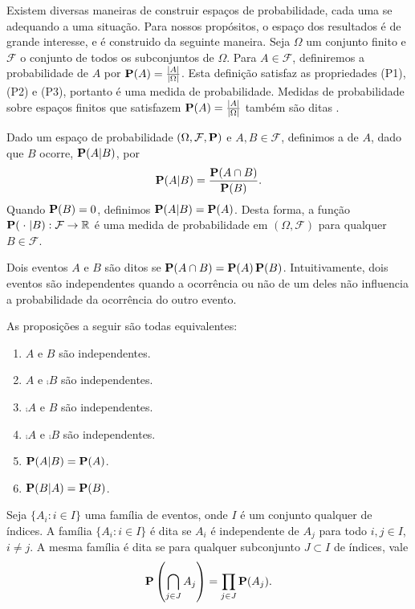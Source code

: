 Existem diversas maneiras de construir espaços de probabilidade, cada uma se adequando a uma situação. Para nossos propósitos, o espaço dos resultados  é de grande interesse, e é construido da seguinte maneira.
Seja $\Omega$ um conjunto finito e $\mathcal{F}$ o conjunto de todos os subconjuntos de $\Omega$. Para $A \in \mathcal{F}$, definiremos a probabilidade de $A$ por $\operatorname{\mathbf{P}}(A) = \frac{\left | A \right |}{\left | \Omega \right |}$. Esta definição satisfaz as propriedades (P1), (P2) e (P3), portanto é uma medida de probabilidade. Medidas de probabilidade sobre espaços finitos que satisfazem $\operatorname{\mathbf{P}}(A) = \frac{\left | A \right |}{\left | \Omega \right |}$ também são ditas .

Dado um espaço de probabilidade $(\Omega, \mathcal{F}, \operatorname{\mathbf{P}})$ e $A, B \in \mathcal{F}$, definimos a  de $A$, dado que $B$ ocorre, $\operatorname{\mathbf{P}}(A | B)$, por
\[ \operatorname{\mathbf{P}}(A|B) = \frac{\operatorname{\mathbf{P}}(A \cap B)}{\operatorname{\mathbf{P}}(B)}. \]
Quando $\operatorname{\mathbf{P}}(B) = 0$, definimos $\operatorname{\mathbf{P}}(A|B) = \operatorname{\mathbf{P}}(A)$. Desta forma, a função $\operatorname{\mathbf{P}}(\; \cdot \;| B) : \mathcal{F} \to \mathbb{R}$ é uma medida de probabilidade em $(\Omega, \mathcal{F})$ para qualquer $B \in \mathcal{F}$.

Dois eventos $A$ e $B$ são ditos  se $\operatorname{\mathbf{P}}(A \cap B) = \operatorname{\mathbf{P}}(A) \operatorname{\mathbf{P}}(B)$. Intuitivamente, dois eventos são independentes quando a ocorrência ou não de um deles não influencia a probabilidade da ocorrência do outro evento.

As proposições a seguir são todas equivalentes:
\begin{enumerate}[label=\arabic*.,itemindent=*]
  \item $A$ e $B$ são independentes.
  \item $A$ e $\comp{B}$ são independentes.
  \item $\comp{A}$ e $B$ são independentes.
  \item $\comp{A}$ e $\comp{B}$ são independentes.
  \item $\operatorname{\mathbf{P}}(A|B) = \operatorname{\mathbf{P}}(A)$.
  \item $\operatorname{\mathbf{P}}(B|A) = \operatorname{\mathbf{P}}(B)$.
\end{enumerate}

Seja $\{ A_i : i \in I\}$ uma família de eventos, onde $I$ é um conjunto qualquer de índices. A família $\{ A_i : i \in I\}$ é dita  se $A_i$ é independente de $A_j$ para todo $i,j \in I$, $i \neq j$. A mesma família é dita  se para qualquer subconjunto $J \subset I$ de índices, vale
\[ \operatorname{\mathbf{P}}\left(\bigcap_{j \in J} A_j \right) = \prod_{j \in J}\operatorname{\mathbf{P}}(A_j).\]

